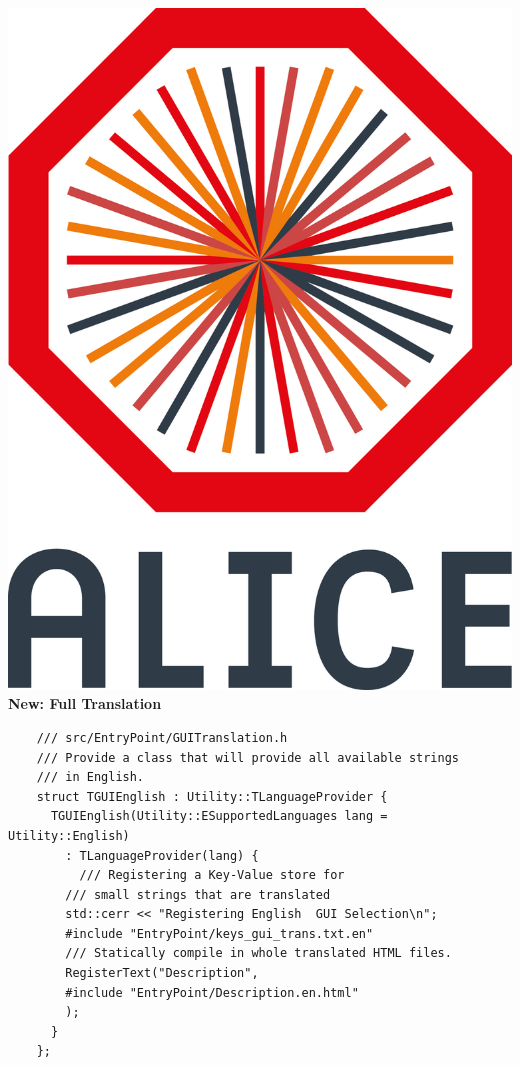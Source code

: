 \documentclass[aspectratio=169,14pt,dvipsnames]{beamer}
\begin{document}
\begin{frame}[fragile]{\includegraphics[height=0.07\textheight]{2012-Jul-04-4_Color_Logo_CB.png} \hspace{0.2cm}\textbf{New: Full Translation}}
  \begin{verbatim}
    /// src/EntryPoint/GUITranslation.h
    /// Provide a class that will provide all available strings
    /// in English.
    struct TGUIEnglish : Utility::TLanguageProvider {
      TGUIEnglish(Utility::ESupportedLanguages lang = Utility::English)
        : TLanguageProvider(lang) {
          /// Registering a Key-Value store for
        /// small strings that are translated
        std::cerr << "Registering English  GUI Selection\n";
        #include "EntryPoint/keys_gui_trans.txt.en"
        /// Statically compile in whole translated HTML files.
        RegisterText("Description",
        #include "EntryPoint/Description.en.html"
        );
      }
    };
  \end{verbatim}
\end{frame}
\end{document}
